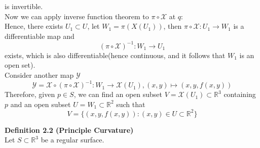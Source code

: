 \documentclass{article}
\begin{document}
is invertible.\\
Now we can apply inverse function theorem to $\pi \circ \mathcal{X}$ at $q$:\\
Hence, there exists $U_1 \subset U$, let $W_1 = \pi(X(U_1))$, then $\pi \circ \mathcal{X}: U_1 \to W_1$
is a differentiable map and 
$$
    (\pi \circ \mathcal{X})^{-1}: W_1 \to U_1
$$
exists, which is also differentiable(hence continuous, and it follows that $W_1$ is an open set).\\
Consider another map $\mathcal{Y}$
$$
    \mathcal{Y} = \mathcal{X} \circ (\pi \circ \mathcal{X})^{-1}: W_1 \to \mathcal{X}(U_1), (x,y) \mapsto (x,y,f(x,y))
$$
Therefore, given $p \in S$, we can find an open subset $V=\mathcal{X}(U_1) \subset \mathbb{R}^3$ containing $p$ and an open subset $U=W_1 \subset \mathbb{R}^2$
such that
$$
    V = \{(x,y,f(x,y)): (x,y) \in U \subset \mathbb{R}^2\}
$$


\par
\textbf{Definition 2.2 (Principle Curvature)}\\
Let $S \subset \mathbb R^3$ be a regular surface.
\end{document}
